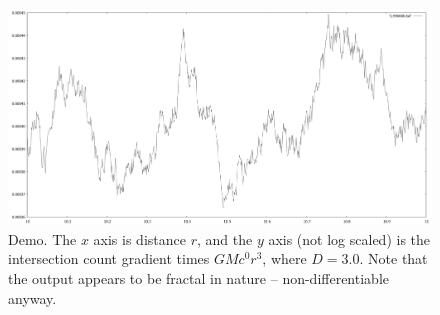 \documentclass[12pt]{article}
\begin{document}
\begin{figure} 
\centering
  \includegraphics[width = 6 in]{fractal.png}
  \caption{
Demo.
The $x$ axis is distance $r$, and the $y$ axis (not log scaled) is the intersection count gradient times $GM c^0 r^3$, where $D = 3.0$.
Note that the output appears to be fractal in nature -- non-differentiable anyway.
}
\end{figure}
\end{document}
